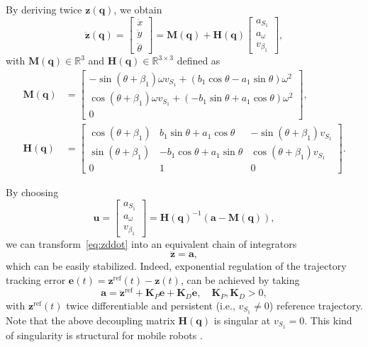 By deriving twice $\bm{z}(\bm{q})$, we obtain
\begin{equation}
\label{eq:zddot}
    \ddot{\bm{z}}(\bm{q})
    =
    \begin{bmatrix}
        \ddot{x} \\ \ddot{y} \\ \ddot{\theta}
    \end{bmatrix}
    =
    \bm{M}(\bm{q}) +
    \bm{H}(\bm{q})
    \begin{bmatrix}
        a_{S_1} \\ a_{\omega} \\ v_{\beta_1}
    \end{bmatrix},
\end{equation}
with $\bm{M}(\bm{q}) \in \mathbb{R}^3$ and $\bm{H}(\bm{q}) \in \mathbb{R}^{3 \times 3}$ defined as
\begin{align*}
    \bm{M}(\bm{q})
    &=
    \begin{bmatrix}
        -\sin(\theta+\beta_1) \omega v_{S_1} + ( b_1 \cos\theta - a_1 \sin\theta) \omega^2 \\
         \cos(\theta+\beta_1) \omega v_{S_1} + (-b_1 \sin\theta + a_1 \cos\theta) \omega^2 \\
        0
    \end{bmatrix}, \\
    \bm{H}(\bm{q})
    &=
    \begin{bmatrix}
        \cos(\theta+\beta_1) &  b_1 \sin\theta + a_1 \cos\theta & -\sin(\theta+\beta_1) v_{S_1} \\
        \sin(\theta+\beta_1) & -b_1 \cos\theta + a_1 \sin\theta &  \cos(\theta+\beta_1) v_{S_1} \\
        0 & 1 & 0
    \end{bmatrix}.
\end{align*}

By choosing
\begin{equation*}
    \bm{u} = \begin{bmatrix}
        a_{S_1} \\ a_{\omega} \\ v_{\beta_1}
    \end{bmatrix}
    = \bm{H}(\bm{q})^{-1} \left(\bm{a} - \bm{M}(\bm{q})\right),
\end{equation*}
we can transform~\eqref{eq:zddot} into an equivalent chain of integrators
\begin{equation*}
    \ddot{\bm{z}} = \bm{a},
\end{equation*}
which can be easily stabilized. Indeed, exponential regulation of the trajectory
tracking error $\bm{e}(t) = \bm{z}^{\mathrm{ref}}(t)-\bm{z}(t)$, can be
achieved by taking
\begin{equation*}
    \bm{a} = \ddot{\bm{z}}^{\mathrm{ref}} + \bm{K}_P \bm{e} + \bm{K}_D \dot{\bm{e}}, \quad \bm{K}_P, \bm{K}_D > 0,
\end{equation*}
with $\bm{z}^{\mathrm{ref}}(t)$ twice differentiable and persistent
(i.e., $v_{S_1} \ne 0$) reference trajectory. Note that the above decoupling
matrix $\bm{H}(\bm{q})$ is singular at $v_{S_1} = 0$. This kind of singularity
is structural for mobile robots \cite{Oriolo2002WMRControlDFL}.

